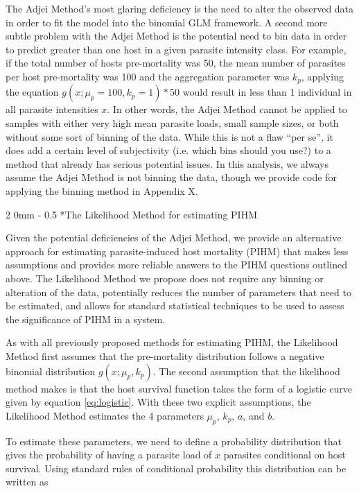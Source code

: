 \documentclass[12pt, a4paper]{article}
\makeatletter
\renewcommand{\subsection}{\@startsection
{subsection}%
{2}%
{0mm}%
{-\baselineskip}%
{0.5\baselineskip}%
{\normalfont\bf}} %
\makeatother
\begin{document}
The Adjei Method's most glaring deficiency is the need to alter the observed
data in order to fit the model into the binomial GLM framework.  A second more
subtle problem with the Adjei Method is the potential need to bin data in order
to predict greater than one host in a given parasite intensity class.  For
example, if the total number of hosts pre-mortality was 50, the mean number of
parasites per host pre-mortality was 100 and the aggregation parameter was
$k_p$, applying the equation $g(x ; \mu_p=100, k_p=1) * 50$ would result in
less than 1 individual in all parasite intensities $x$. In other words, the
Adjei Method cannot be applied to samples with either very high mean parasite
loads, small sample sizes, or both without some sort of binning of the data.
While this is not a flaw ``per se'', it does add a certain level of
subjectivity (i.e. which bins should you use?) to a method that already has
serious potential issues.  In this analysis, we always assume the Adjei Method is not binning the data, though we provide code for applying the binning method in Appendix X.

\subsection*{The Likelihood Method for estimating PIHM}

Given the potential deficiencies of the Adjei Method, we provide an alternative
approach for estimating parasite-induced host mortality (PIHM) that makes less
assumptions and provides more reliable answers to the PIHM questions outlined above.  The Likelihood Method we propose
does not require any binning or alteration of the data, potentially reduces the
number of parameters that need to be estimated, and allows for standard
statistical techniques to be used to assess the significance of PIHM in a
system.

As with all previously proposed methods for estimating PIHM, the
Likelihood Method first assumes that the pre-mortality distribution follows a
negative binomial distribution $g(x; \mu_p, k_p)$.  The second
assumption that the likelihood method makes is that the host survival function
takes the form of a logistic curve given by equation \ref{eq:logistic}.  With these two explicit assumptions, the Likelihood Method estimates the 4 parameters $\mu_p$, $k_p$, $a$, and $b$.

To estimate these parameters, we need to define a probability distribution that gives the probability of having a parasite load of $x$ parasites conditional on host survival.  Using standard rules of conditional probability this distribution can be written as
\end{document}
